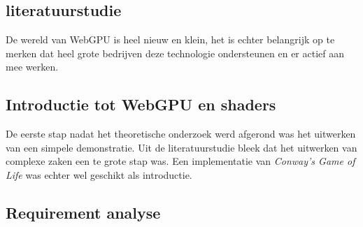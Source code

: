 
\chapter{}%
\label{ch:methodologie}


\section{literatuurstudie}

De wereld van WebGPU is heel nieuw en klein, het is echter belangrijk op te merken dat heel grote bedrijven deze technologie ondersteunen en er actief aan mee werken. 

\section{Introductie tot WebGPU en shaders}

De eerste stap nadat het theoretische onderzoek werd afgerond was het uitwerken van een simpele demonstratie. Uit de literatuurstudie bleek dat het uitwerken van complexe zaken een te grote stap was. Een implementatie van \textit{Conway's Game of Life} was echter wel geschikt als introductie.

\section{Requirement analyse}

